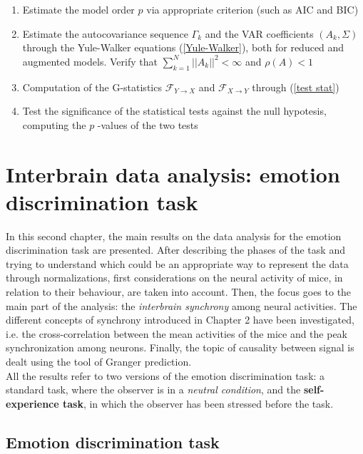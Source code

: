 \documentclass[12pt, a4paper]{report}
\begin{document}
\begin{enumerate}
	\item Estimate the model order $p$ via appropriate criterion (such as AIC and BIC)
	
	\item Estimate the autocovariance sequence $\Gamma_k$ and the VAR coefficients $(A_k, \Sigma)$ through the Yule-Walker equations (\ref*{Yule-Walker}), both for reduced and augmented models. Verify that $ \sum_{k=1}^{N}||A_k||^2 < \infty $ and  $\rho(A) < 1$
	
	\item Computation of the G-statistics $ \mathcal{F}_{Y \rightarrow X} $ and $ \mathcal{F}_{X \rightarrow Y} $ through (\ref{test stat})
	
	\item Test the significance of the statistical tests against the null hypotesis, computing the $p$ -values of the two tests 
	
\end{enumerate}





\newpage
\chapter{Interbrain data analysis: emotion discrimination task}

In this second chapter, the main results on the data analysis for the emotion discrimination task are presented. After describing the phases of the task and trying to understand which could be an appropriate way  to represent the data through normalizations, first considerations on the neural activity of mice, in relation to their behaviour, are taken into account. Then, the focus goes to the main part of the analysis: the \textit{interbrain synchrony} among neural activities. The different concepts of synchrony introduced in Chapter 2 have been investigated, i.e. the cross-correlation between the mean activities of the mice and the peak synchronization among neurons. Finally, the topic of causality between signal is dealt using the tool of Granger prediction.\\
All the results refer to two versions of the emotion discrimination task: a standard task, where the observer is in a \textit{neutral condition}, and the \textbf{self-experience task}, in which the observer has been stressed before the task.


\section{Emotion discrimination task}
\end{document}
